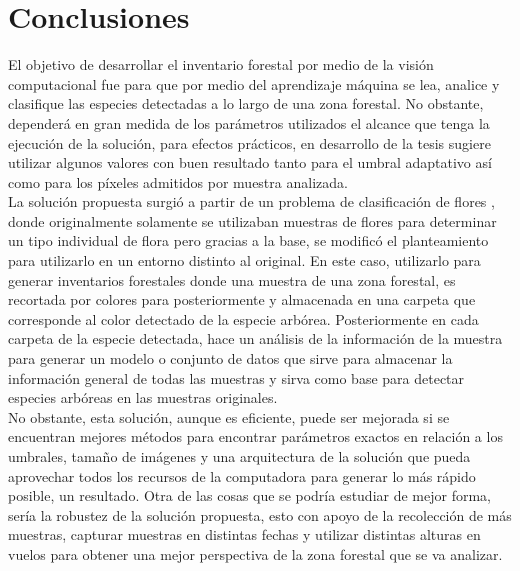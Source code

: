 \documentclass[review]{elsarticle}
\begin{document}
\section{Conclusiones}
El objetivo de desarrollar el inventario forestal por medio de la visión computacional fue para que por medio del aprendizaje máquina se lea, analice y clasifique las especies detectadas a lo largo de una zona forestal. No obstante, dependerá en gran medida de los parámetros utilizados el alcance que tenga la ejecución de la solución, para efectos prácticos, en desarrollo de la tesis sugiere utilizar algunos valores con buen resultado tanto para el umbral adaptativo así como para los píxeles admitidos por muestra analizada.\\

La solución propuesta surgió a partir de un problema de clasificación de flores \citep{rf17},  donde originalmente solamente se utilizaban muestras de flores para determinar un tipo individual de flora pero gracias a la base, se modificó el planteamiento para utilizarlo en un entorno distinto al original. En este caso, utilizarlo para generar inventarios forestales donde una muestra de una zona forestal, es recortada por colores para posteriormente y almacenada en una carpeta que corresponde al color detectado de la especie arbórea. Posteriormente en cada carpeta de la especie detectada, hace un análisis de la información de la muestra para generar un modelo  o conjunto de datos que sirve para almacenar la información general de todas las muestras y sirva como base para detectar especies arbóreas en las muestras originales.\\

No obstante, esta solución, aunque es eficiente, puede ser mejorada si se encuentran mejores métodos para encontrar parámetros exactos en relación a los umbrales, tamaño de imágenes y una arquitectura de la solución que pueda aprovechar todos los recursos de la computadora para generar lo más rápido posible, un resultado. Otra de las cosas que se podría estudiar de mejor forma, sería la robustez de la solución propuesta, esto con apoyo de la recolección de más muestras, capturar muestras en distintas fechas y  utilizar distintas alturas en vuelos para obtener una mejor perspectiva de la zona forestal que se va analizar.



\end{document}
